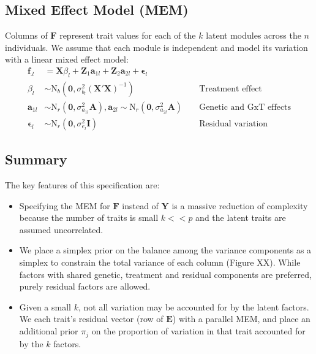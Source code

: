 \documentclass[11pt]{amsart}
\begin{document}
\subsection{Mixed Effect Model (MEM)}
Columns of $\mathbf{F}$ represent trait values for each of the $k$ latent modules across the $n$ individuals. We assume that each module is independent and model its variation with a linear mixed effect model:
\begin{align}
\mathbf{f}_{.l} &= \mathbf{X} \beta_l + \mathbf{Z}_1 \mathbf{a}_{1l} + \mathbf{Z}_2 \mathbf{a}_{2l} + \mathbf{\epsilon}_l \\
\beta_l &\sim \mbox{N}_b(\mathbf{0},\sigma^2_{b_l} (\mathbf{X}'\mathbf{X})^{-1}) &&\mbox { Treatment effect} \nonumber \\
\mathbf{a}_{1l} &\sim \mbox{N}_r(\mathbf{0},\sigma^2_{a_{1l}} \mathbf{A}), \mathbf{a}_{2l} \sim \mbox{N}_r(\mathbf{0},\sigma^2_{a_{2l}} \mathbf{A}) 
	&&\mbox { Genetic and GxT effects}  \nonumber \\
\mathbf{\epsilon}_l &\sim \mbox{N}_r(\mathbf{0},\sigma^2_{e_l} \mathbf{I}) &&\mbox { Residual variation}  \nonumber
\end{align}


\subsection{Summary}
The key features of this specification are:
\begin{itemize}
\item Specifying the MEM for $\mathbf{F}$ instead of $\mathbf{Y}$ is a massive reduction of complexity because the number of traits is small $k << p$ and the latent traits are assumed uncorrelated.
\item We place a simplex prior on the balance among the variance components as a simplex to constrain the total variance of each column (Figure XX). While factors with shared genetic, treatment and residual components are preferred, purely residual factors are allowed.
\item Given a small $k$, not all variation may be accounted for by the latent factors. We each trait's residual vector (row of $\mathbf{E}$) with a parallel MEM, and place an additional prior $\pi_j$ on the proportion of variation in that trait accounted for by the $k$ factors.
\end{itemize}
\end{document}
